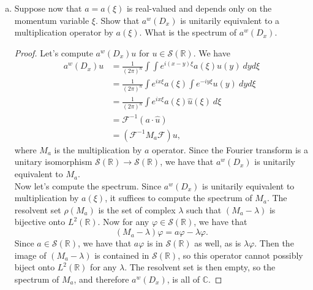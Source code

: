 \documentclass[11pt,letterpaper]{report}
\newcommand{\complex}{\mathbb{C}}
\newcommand{\reals}{\mathbb{R}}
\newcommand{\mcal}[1]{\mathcal{#1}}
\begin{document}
\begin{enumerate}[(a)]
\begin{proof}
	\end{proof}
	\item Suppose now that $a = a(\xi)$ is real-valued and depends only on the momentum variable $\xi$. Show that $a^w(D_x)$ is unitarily equivalent to a multiplication operator by $a(\xi)$. What is the spectrum of $a^w(D_x)$.
	\begin{proof}
		Let's compute $a^w(D_x)u$ for $u\in \mcal{S}(\reals)$. We have
		\begin{align*}
			a^w(D_x)u &= \frac{1}{(2\pi)^n}\int\int e^{i(x-y)\xi}a(\xi)u(y)\ dyd\xi\\
			&= \frac{1}{(2\pi)^n}\int e^{ix\xi}a(\xi)\int e^{-iy\xi}u(y)\ dy d\xi\\
			&= \frac{1}{(2\pi)^n}\int e^{ix\xi}a(\xi)\widehat{u}(\xi)\ d\xi\\
			&= \mcal{F}^{-1}(a\cdot \widehat{u})\\
			&= (\mcal{F}^{-1}M_a\mcal{F})u,
		\end{align*}
		where $M_a$ is the multiplication by $a$ operator. Since the Fourier transform is a unitary isomorphism $\mcal{S}(\reals)\to \mcal{S}(\reals)$, we have that $a^w(D_x)$ is unitarily equivalent to $M_a$.\\
		Now let's compute the spectrum. Since $a^w(D_x)$ is unitarily equivalent to multiplication by $a(\xi)$, it suffices to compute the spectrum of $M_a$. The resolvent set $\rho(M_a)$ is the set of complex $\lambda$ such that $(M_a-\lambda)$ is bijective onto $L^2(\reals)$. Now for any $\varphi \in \mcal{S}(\reals)$, we have that
		\[
		(M_a-\lambda)\varphi = a\varphi - \lambda\varphi.
		\]
		Since $a\in \mcal{S}(\reals)$, we have that $a\varphi$ is in $\mcal{S}(\reals)$ as well, as is $\lambda\varphi$. Then the image of $(M_a-\lambda)$ is contained in $\mcal{S}(\reals)$, so this operator cannot possibly biject onto $L^2(\reals)$ for any $\lambda$. The resolvent set is then empty, so the spectrum of $M_a$, and therefore $a^w(D_x)$, is all of $\complex$.
	\end{proof}
\end{enumerate}
\end{document}
